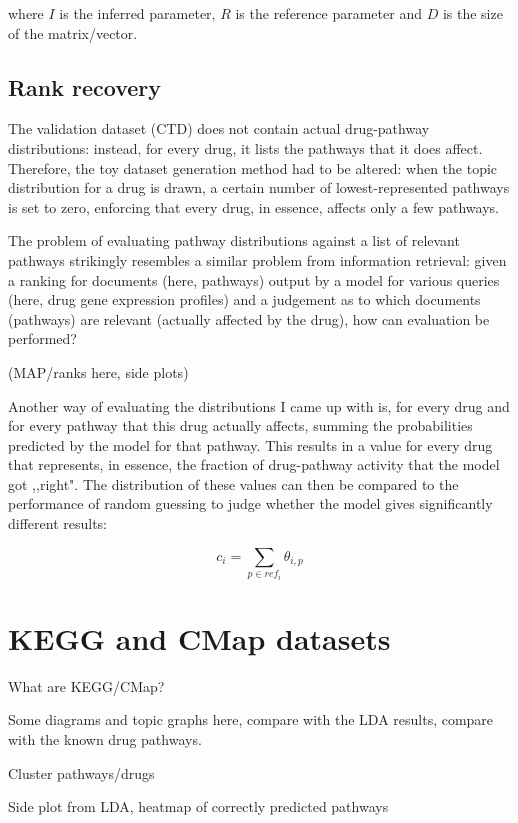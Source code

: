 \documentclass[12pt,a4paper,twoside,openright]{report}
\begin{document}
where $I$ is the inferred parameter, $R$ is the reference parameter and $D$ is the size of the matrix/vector.

\subsection{Rank recovery}

The validation dataset (CTD) does not contain actual drug-pathway distributions: instead, for every drug, it lists the pathways that it does affect. Therefore, the toy dataset generation method had to be altered: when the topic distribution for a drug is drawn, a certain number of lowest-represented pathways is set to zero, enforcing that every drug, in essence, affects only a few pathways.

The problem of evaluating pathway distributions against a list of relevant pathways strikingly resembles a similar problem from information retrieval: given a ranking for documents (here, pathways) output by a model for various queries (here, drug gene expression profiles) and a judgement as to which documents (pathways) are relevant (actually affected by the drug), how can evaluation be performed?

(MAP/ranks here, side plots)

Another way of evaluating the distributions I came up with is, for every drug and for every pathway that this drug actually affects, summing the probabilities predicted by the model for that pathway. This results in a value for every drug that represents, in essence, the fraction of drug-pathway activity that the model got ,,right". The distribution of these values can then be compared to the performance of random guessing to judge whether the model gives significantly different results:

\begin{equation}
c_i = \sum\limits_{p \in ref_i}{\theta_{i, p}}
\end{equation}

\section{KEGG and CMap datasets}

What are KEGG/CMap?

Some diagrams and topic graphs here, compare with the LDA results, compare with the known drug pathways.

Cluster pathways/drugs

Side plot from LDA, heatmap of correctly predicted pathways
\end{document}
